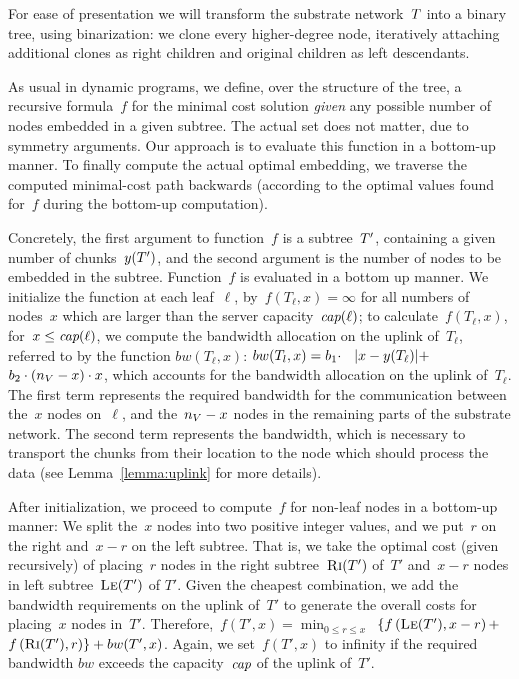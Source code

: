 For ease of presentation we will transform the
substrate network~$T$
into a binary tree, using binarization:
we clone every higher-degree node,
iteratively attaching additional clones as right children
and original children as left descendants.

As usual in dynamic programs, we define, over the structure of the tree, a
recursive formula~$f$ for
the minimal cost solution \emph{given} any possible number of nodes
embedded in a given subtree. The actual set does not matter,
due to symmetry arguments.
Our approach is to evaluate this function in a bottom-up
manner.
To finally compute the actual optimal embedding,
we traverse the computed minimal-cost path backwards
(according to
the optimal values found for~$f$ during the bottom-up computation).

Concretely, the first argument to function~$f$
is a subtree~$T'$, containing a given number of
chunks~$y(T')$,
and the
second argument is the number of nodes to be embedded in the subtree.
Function~$f$ is evaluated in a bottom up manner. We initialize the
function at each leaf~$\ell$, by~$f(T_{\ell},x) =
\infty$ for all numbers of nodes~$x$ which are larger than
the server capacity~$\emph{cap}(\ell)$;
to calculate~$f(T_{\ell}, x)$, for~$x \leq \emph{cap}(\ell)$, we compute the
bandwidth allocation on the uplink of~$T_{\ell}$, referred to by the function
$bw(T_{\ell},x)$:
$bw(T_l,x)=  b_1 \cdot~$~$|x - y(T_{\ell})| +$~$ b_2 \cdot
(n_V - x) \cdot x$,
which accounts for the bandwidth allocation on the uplink of~$T_{\ell}$. The
first
term represents the required bandwidth for the communication between the~$x$
nodes on~$\ell$, and the~$n_V - x$ nodes in the remaining parts of the substrate
network.
The second term represents
the bandwidth, which is necessary to transport the chunks from their location to
the node which should process the data (see Lemma~\ref{lemma:uplink} for more
details).

After initialization, we proceed to compute~$f$ for non-leaf
nodes in a bottom-up manner: We split the~$x$ nodes
into two positive integer
values, and we put~$r$ on the right and~$x - r$ on the left subtree.
That is, we take the optimal cost
(given recursively) of placing~$r$ nodes in
the right subtree~$\textsc{Ri}(T')$ of~$T'$ and~$x-r$ nodes in left subtree~$\textsc{Le}(T')$ of
$T'$. Given the cheapest combination, we add the bandwidth requirements
on the uplink of~$T'$ to generate the overall costs for placing~$x$ nodes in~$T'$.
Therefore,~$f(T',x) =   \min_{0\leq r \leq x}$~$ \{  f\left(\textsc{Le}(T'),
x-r\right) +$~$
f\left(\textsc{Ri}(T'), r\right) \} + bw(T',x)$.
Again, we set~$f(T',x)$ to infinity if the required bandwidth
$bw$ exceeds the capacity~$\emph{cap}$ of the uplink of~$T'$.


